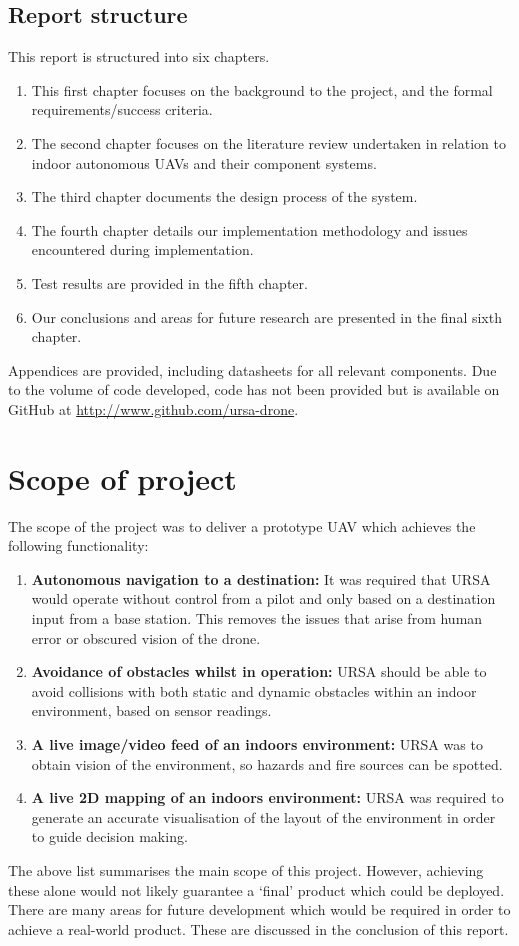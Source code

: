 \documentclass[capstone_report.tex]{subfiles}
\begin{document}
\subsection{Report structure}
This report is structured into six chapters. 
\begin{enumerate}
    \item This first chapter focuses on the background to the project, and the formal requirements/success criteria. 
    \item The second chapter focuses on the literature review undertaken in relation to indoor autonomous UAVs and their component systems. 
    \item The third chapter documents the design process of the system. 
    \item The fourth chapter details our implementation methodology and issues encountered during implementation. 
    \item Test results are provided in the fifth chapter. 
    \item Our conclusions and areas for future research are presented in the final sixth chapter.\\
\end{enumerate}

Appendices are provided, including datasheets for all relevant components. Due to the volume of code developed, code has not been provided but is available on GitHub at \url{http://www.github.com/ursa-drone}.

\section{Scope of project}
The scope of the project was to deliver a prototype UAV which achieves the following functionality:
\begin{enumerate}
	\item \textbf{Autonomous navigation to a destination:} It was required that URSA would operate without control from a pilot and only based on a destination input from a base station. This removes the issues that arise from human error or obscured vision of the drone.
	\item \textbf{Avoidance of obstacles whilst in operation:} URSA should be able to avoid collisions with both static and dynamic obstacles within an indoor environment, based on sensor readings.
	\item \textbf{A live image/video feed of an indoors environment:} URSA was to obtain vision of the environment, so hazards and fire sources can be spotted.
	\item \textbf{A live 2D mapping of an indoors environment:} URSA was required to generate an accurate visualisation of the layout of the environment in order to guide decision making.
\end{enumerate}


The above list summarises the main scope of this project. However, achieving these alone would not likely guarantee a `final' product which could be deployed. There are many areas for future development which would be required in order to achieve a real-world product. These are discussed in the conclusion of this report.  
\end{document}
